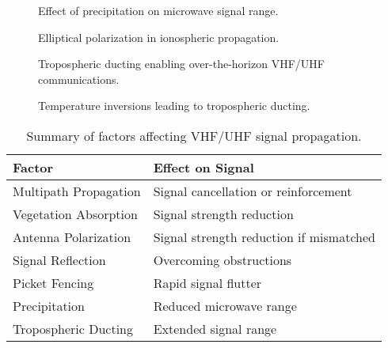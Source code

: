 \begin{figure}[h]
    \centering
    \caption{Effect of precipitation on microwave signal range.}
    \label{fig:precipitation-effect}
\end{figure}

\begin{figure}[h]
    \centering
    \caption{Elliptical polarization in ionospheric propagation.}
    \label{fig:elliptical-polarization}
\end{figure}

\begin{figure}[h]
    \centering
    \caption{Tropospheric ducting enabling over-the-horizon VHF/UHF communications.}
    \label{fig:tropospheric-ducting}
\end{figure}

\begin{figure}[h]
    \centering
    \caption{Temperature inversions leading to tropospheric ducting.}
    \label{fig:temperature-inversions}
\end{figure}

\begin{table}[h]
    \centering
    \caption{Summary of factors affecting VHF/UHF signal propagation.}
    \label{tab:vhf-uhf-propagation-factors}
    \begin{tabular}{|l|l|}
        \hline
        \textbf{Factor} & \textbf{Effect on Signal} \\
        \hline
        Multipath Propagation & Signal cancellation or reinforcement \\
        Vegetation Absorption & Signal strength reduction \\
        Antenna Polarization & Signal strength reduction if mismatched \\
        Signal Reflection & Overcoming obstructions \\
        Picket Fencing & Rapid signal flutter \\
        Precipitation & Reduced microwave range \\
        Tropospheric Ducting & Extended signal range \\
        \hline
    \end{tabular}
\end{table}

